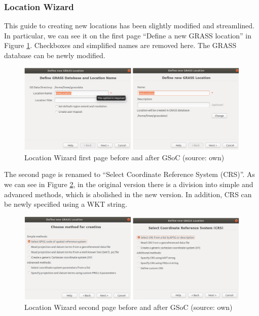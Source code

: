 \documentclass[a4paper,10pt,twoside]{article}
\begin{document}
\newpage
\vspace*{-1cm}
\subsubsection{Location Wizard}

This guide to creating new locations has been slightly modified and streamlined. In particular, we can see it on the first page ``Define a new GRASS location'' in Figure \ref{fig:loc_wiz_1}. Checkboxes and simplified names are removed here. The GRASS database can be newly modified.

\vspace{0.3cm}
\begin{figure}[hbt!] 
\begin{center}
\includegraphics[width=17cm]{../pictures/loc_wiz_1.png} 
\caption[Location Wizard first page before and after GSoC]{Location Wizard first page before and after GSoC (source: own)}
\label{fig:loc_wiz_1}
\end{center}
\end{figure}

\noindent The second page is renamed to ``Select Coordinate Reference System (CRS)''. As we can see in Figure \ref{fig:loc_wiz_2}, in the original version there is a division into simple and advanced methods, which is abolished in the new version. In addition, CRS can be newly specified using a WKT string.

\vspace{0.3cm}
\begin{figure}[hbt!] 
\begin{center}
\includegraphics[width=17cm]{../pictures/loc_wiz_2.png} 
\caption[Location Wizard second page before and after GSoC]{Location Wizard second page before and after GSoC (source: own)}
\label{fig:loc_wiz_2}
\end{center}
\end{figure}
\end{document}
